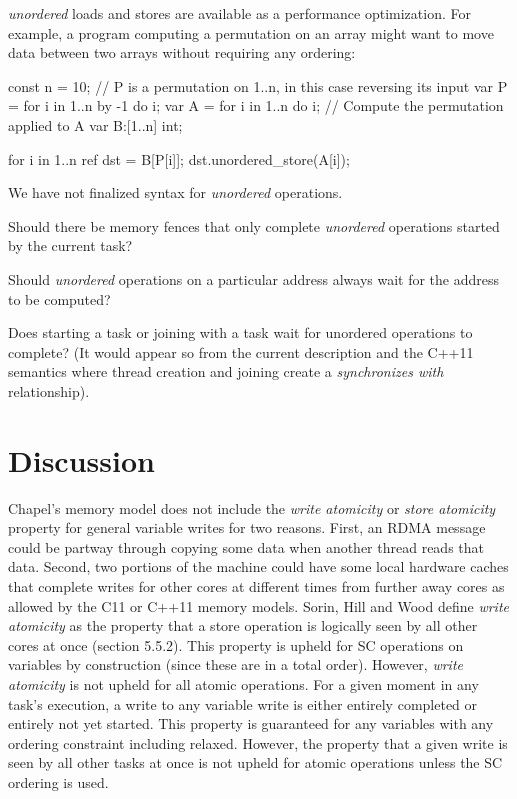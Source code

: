 \textit{unordered} loads and stores are available as a performance
optimization. For example, a program computing a permutation on an array might
want to move data between two arrays without requiring any ordering:

\begin{chapel}
const n = 10;
// P is a permutation on 1..n, in this case reversing its input
var P = for i in 1..n by -1 do i;
var A = for i in 1..n do i;
// Compute the permutation applied to A
var B:[1..n] int;

for i in 1..n {
  ref dst = B[P[i]];
  dst.unordered_store(A[i]);
}
\end{chapel}

\begin{openissue}
  We have not finalized syntax for \textit{unordered} operations.

  Should there be memory fences that only complete \textit{unordered} operations started by the current task?

  Should \textit{unordered} operations on a particular address always wait for the address to be computed?

  Does starting a task or joining with a task wait for unordered
  operations to complete? (It would appear so from the current description
  and the C++11 semantics where thread creation and joining create a
  \textit{synchronizes with} relationship).
\end{openissue}

\section{Discussion}

Chapel's memory model does not include the \textit{write atomicity} or
\textit{store atomicity} property for general variable writes for two reasons.
First, an RDMA message could be partway through copying some data when another
thread reads that data. Second, two portions of the machine could have some
local hardware caches that complete writes for other cores at different times
from further away cores as allowed by the C11 or C++11 memory models. Sorin,
Hill and Wood define \textit{write atomicity} as the property that a store
operation is logically seen by all other cores at once (section 5.5.2). This
property is upheld for SC operations on  variables by
construction (since these are in a total order). However, \textit{write
atomicity} is not upheld for all atomic operations. For a given moment in any
task's execution, a write to any  variable write is either
entirely completed or entirely not yet started. This property is guaranteed for
any  variables with any ordering constraint including relaxed.
However, the property that a given write is seen by all other tasks at once is
not upheld for atomic operations unless the SC ordering is used.

